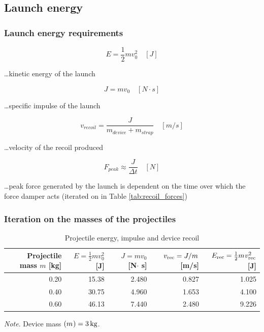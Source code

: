 \documentclass[a4paper,10pt]{article} %
\begin{document}
\newpage

\subsection{Launch energy}

\subsubsection{Launch energy requirements}

\begin{equation}
    E = \frac{1}{2}mv^2_0 \quad [J]
\end{equation}

\ldots kinetic energy of the launch

\begin{equation}
    J = mv_0 \quad [N \cdot s]
\label{eqn:impulse}
\end{equation}

\ldots specific impulse of the launch

\begin{equation}
    v_{recoil} = \frac{J}{m_{device}+m_{strap}} \quad [m/s]
\end{equation}

\ldots velocity of the recoil produced

\begin{equation}
    F_{peak} \approx \frac{J}{\Delta t} \quad [N]
    \label{eqn:fpeak}
\end{equation}

\ldots peak force generated by the launch is dependent on the time over which the force damper acts (iterated on in Table \ref{tab:recoil_forces})

\subsubsection{Iteration on the masses of the projectiles}


\begin{table}[ht]
\centering
\caption{Projectile energy, impulse and device recoil}
\label{tab:proj_energy_recoil}
\begin{tabular}{@{}rrrrr@{}}
\toprule
Projectile mass $m$ [kg] & $E=\tfrac12 m v_0^2$ [J] & $J=m v_0$ [N$\cdot$ s] & {$v_{\rm rec}=J/m_{\rm}$ [m/s]} & $E_{\rm rec}=\tfrac12 m_{\rm} v_{\rm rec}^2$ [J] \\
\midrule
0.20 & 15.38 & 2.480 & 0.827 & 1.025 \\
0.40 & 30.75 & 4.960 & 1.653 & 4.100 \\
0.60 & 46.13 & 7.440 & 2.480 & 9.226 \\
\bottomrule
\end{tabular}
\begin{tablenotes}[flushleft]
\footnotesize
\textit{Note}. Device mass $(m_{\rm}) = 3\,\mathrm{kg}$.
\end{tablenotes}
\end{table}
\end{document}

